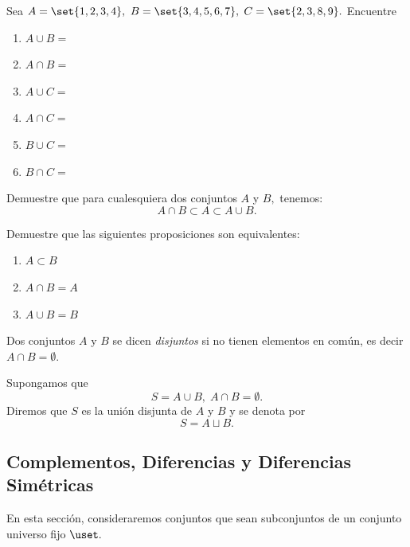 	\begin{problema}
		\label{lip:exmp:1.4.a}
		Sea $A=\set{1,2,3,4},$ $B=\set{3,4,5,6,7},$ $C=\set{2,3,8,9}.$ Encuentre 
		\begin{enumerate}
			\item $A \cup B=$ 
			\item $A \cap B=$ 
			\item $A \cup C=$ 
			\item $A \cap C=$ 
			\item $B \cup C=$ 
			\item $B \cap C=$
		\end{enumerate}
		
	\end{problema}
	



	\begin{problema}
		\label{thm:1.3}
		Demuestre que para cualesquiera dos conjuntos $A$ y $B,$ tenemos:
		$$
		A \cap B \subset A \subset A \cup B.
		$$
	\end{problema}
	



	\begin{problema}
		\label{thm:1.4}
		Demuestre que las siguientes proposiciones son equivalentes:
		\begin{enumerate}
			\item $\displaystyle A \subset B$
			\item $\displaystyle A \cap B = A$
			\item $\displaystyle A \cup B = B$
		\end{enumerate}
		
	\end{problema}
	



	Dos conjuntos $A$ y $B$ se dicen \emph{disjuntos} si no tienen elementos en común, es decir $A\cap B=\emptyset$.
	
	
	Supongamos que 
	$$
	S=A\cup B, \; A\cap B=\emptyset.
	$$  Diremos que $S$ es la unión disjunta de $A$ y $B$ y se denota por $$S=A \sqcup B.$$ 
	


\subsection{Complementos, Diferencias y Diferencias Sim\'etricas}


	En esta sección, consideraremos conjuntos que sean subconjuntos de un conjunto universo fijo $\uset.$



